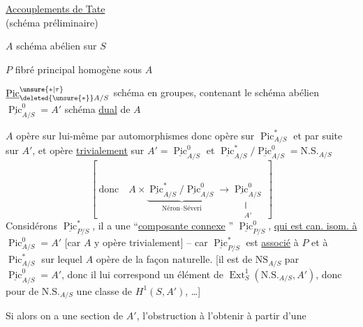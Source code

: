 \begin{flushright}\uline{Accouplements de Tate}\\(schéma préliminaire)\end{flushright}
$A$ schéma abélien sur $S$

$P$ fibré principal homogène sous $A$

$\underline{\operatorname{Pic}}^{\unsure{*|\tau}}_{\deleted{\unsure{*}}A/S}$ schéma en groupes, contenant le schéma abélien $\underline{\operatorname{Pic}}^0_{A/S}=A'$ schéma \uline{dual} de $A$

$A$ opère sur lui-même par automorphismes donc opère sur $\operatorname{Pic}^*_{A/S}$ et par suite sur $A'$, et opère \uline{trivialement} sur $A'=\underline{\operatorname{Pic}}^0_{A/S}$ et $\underline{\operatorname{Pic}}^*_{A/S}/\underline{\operatorname{Pic}}^0_{A/S}=\mathrm{N.S.}_{A/S}$
\[
\left[\ \text{donc}\quad A\times\underbrace{\underline{\operatorname{Pic}}^*_{A/S}/\underline{\operatorname{Pic}}^0_{A/S}}_{\text{Néron--Séveri}}\longrightarrow\underset{\substack{\Vert\\A'}}{\underline{\operatorname{Pic}}^0_{A/S}}\ \right]
\]
Considérons $\underline{\operatorname{Pic}}^*_{P/S}$, il a une ``\uline{composante connexe} '' $\underline{\operatorname{Pic}}^0_{P/S}$, \uline{qui est can. isom. à} $\operatorname{Pic}^0_{A/S}=A'$ [car $A$ y opère trivialement] -- car $\underline{\operatorname{Pic}}^*_{P/S}$ est \uline{associé} à $P$ et à $\operatorname{Pic}^*_{A/S}$ sur lequel $A$ opère de la façon naturelle. [il est  de $\mathrm{NS}_{A/S}$ par $\underline{\operatorname{Pic}}^0_{A/S}=A'$, donc il lui correspond \margin{\deleted{$\unsure{\xi|\varepsilon|\lambda}$}} un élément de $\operatorname{Ext}^1_S(\mathrm{N.S.}_{A/S},A')$, donc pour    de $\mathrm{N.S.}_{A/S}$ une classe de $H^1(S,A')$,  \ldots]

Si alors on a une section de $A'$, l'obstruction à l'obtenir à partir d'une
